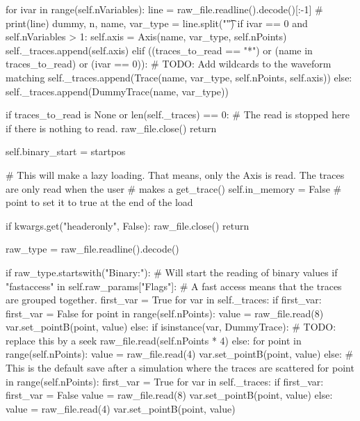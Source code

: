         for ivar in range(self.nVariables):
            line = raw_file.readline().decode()[:-1]
            # print(line)
            dummy, n, name, var_type = line.split("\t")
            if ivar == 0 and self.nVariables > 1:
                self.axis = Axis(name, var_type, self.nPoints)
                self._traces.append(self.axis)
            elif ((traces_to_read == "*") or
                      (name in traces_to_read) or
                      (ivar == 0)):
                # TODO: Add wildcards to the waveform matching
                self._traces.append(Trace(name, var_type, self.nPoints, self.axis))
            else:
                self._traces.append(DummyTrace(name, var_type))

        if traces_to_read is None or len(self._traces) == 0:
            # The read is stopped here if there is nothing to read.
            raw_file.close()
            return

        self.binary_start = startpos

        # This will make a lazy loading. That means, only the Axis is read. The traces are only read when the user
        # makes a get_trace()
        self.in_memory = False  # point to set it to true at the end of the load

        if kwargs.get("headeronly", False):
            raw_file.close()
            return



        raw_type = raw_file.readline().decode()

        if raw_type.startswith("Binary:"):
            # Will start the reading of binary values
            if "fastaccess" in self.raw_params["Flags"]:
                # A fast access means that the traces are grouped together.
                first_var = True
                for var in self._traces:
                    if first_var:
                        first_var = False
                        for point in range(self.nPoints):
                            value = raw_file.read(8)
                            var.set_pointB(point, value)
                    else:
                        if isinstance(var, DummyTrace):
                            # TODO: replace this by a seek
                            raw_file.read(self.nPoints * 4)
                        else:
                            for point in range(self.nPoints):
                                value = raw_file.read(4)
                            var.set_pointB(point, value)
            else:
                # This is the default save after a simulation where the traces are scattered
                for point in range(self.nPoints):
                    first_var = True
                    for var in self._traces:
                        if first_var:
                            first_var = False
                            value = raw_file.read(8)
                            var.set_pointB(point, value)
                        else:
                            value = raw_file.read(4)
                            var.set_pointB(point, value)

